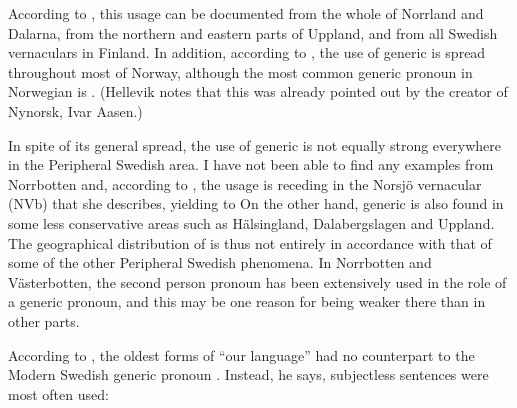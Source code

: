 According to \citet[84]{Westerberg2004}, this usage can be documented from the whole of Norrland and Dalarna, from the northern and eastern parts of Uppland, and from all Swedish vernaculars in Finland. In addition, according to \citet[48]{Hellevik1979}, the use of generic  is spread throughout most of Norway, although the most common generic pronoun in Norwegian is . (Hellevik notes that this was already pointed out by the creator of Nynorsk, Ivar Aasen.)

In spite of its general spread, the use of generic  is not equally strong everywhere in the Peripheral Swedish area. I have not been able to find any examples from Norrbotten and, according to \citet[85]{Westerberg2004}, the usage is receding in the Norsjö vernacular (NVb) that she describes, yielding to On the other hand, generic  is also found in some less conservative areas such as Hälsingland, Dalabergslagen and Uppland. The geographical distribution of  is thus not entirely in accordance with that of some of the other Peripheral Swedish phenomena. In Norrbotten and Västerbotten, the second person pronoun  has been extensively used in the role of a generic pronoun, and this may be one reason for  being weaker there than in other parts. 

According to \citet[73]{Wessén1956}, the oldest forms of “our language” had no counterpart to the Modern Swedish generic pronoun . Instead, he says, subjectless sentences were most often used: 

\ea\label{}
\\

\z 
\z

